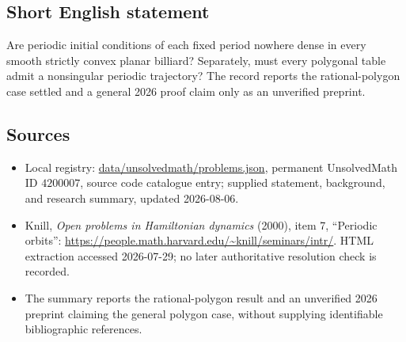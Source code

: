 \documentclass[11pt]{article}
\begin{document}
\subsection{Short English statement}
Are periodic initial conditions of each fixed period nowhere dense in every smooth strictly convex planar billiard? Separately, must every polygonal table admit a nonsingular periodic trajectory? The record reports the rational-polygon case settled and a general 2026 proof claim only as an unverified preprint.
\subsection{Sources}
\begin{itemize}
\item Local registry: \url{data/unsolvedmath/problems.json}, permanent UnsolvedMath ID \(4200007\), source code catalogue entry; supplied statement, background, and research summary, updated 2026-08-06.
\item Knill, \emph{Open problems in Hamiltonian dynamics} (2000), item 7, ``Periodic orbits'': \url{https://people.math.harvard.edu/~knill/seminars/intr/}. HTML extraction accessed 2026-07-29; no later authoritative resolution check is recorded.
\item The summary reports the rational-polygon result and an unverified 2026 preprint claiming the general polygon case, without supplying identifiable bibliographic references.
\end{itemize}
\end{document}
